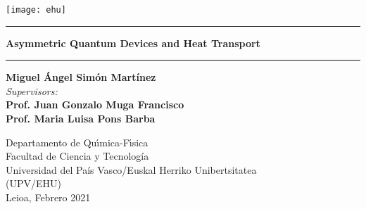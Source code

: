 \begin{titlepage}
\thispagestyle{empty} %
\hspace{-0.3cm}\texttt{[image: ehu]}\hspace{0.3cm}
\bigskip
{\centering \large
\par \vspace{1cm}

\hrule\vspace*{0.5cm}

{\LARGE \bf {Asymmetric Quantum Devices and Heat Transport}}

\vspace{0.7cm}\hrule \vspace{2.75cm}
{\LARGE \bf{Miguel \'{A}ngel Sim\'{o}n Mart\'{i}nez}}\\
\vspace{1.25cm}
{\it{Supervisors:}} \\
\vspace{0.1cm}
{\large \bf {Prof. Juan Gonzalo Muga Francisco}}\\
{\large \bf {Prof. Maria Luisa Pons Barba}}\\
\vspace{2.2cm}
\begin{figure}[h]
{\centering {

}\par}
\end{figure}
\vspace{1.0cm}
Departamento de Qu\'{\i}mica-F\'{\i}sica\\
Facultad de Ciencia y Tecnolog\'ia\\
Universidad del Pa\'is Vasco/Euskal Herriko Unibertsitatea\\ (UPV/EHU)\\
\vspace*{1.0cm}
\hspace{5.5cm}Leioa, Febrero 2021} \pagebreak
\end{titlepage}
